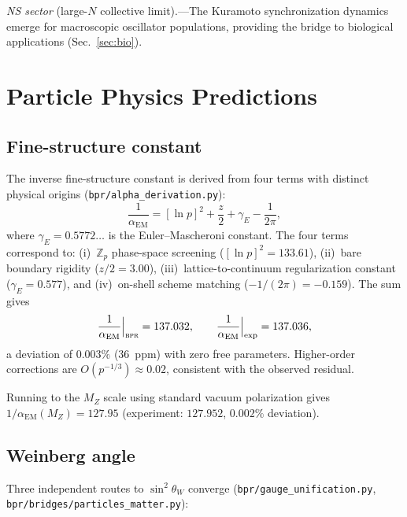 \documentclass[aps,prd,twocolumn,superscriptaddress,longbibliography,nofootinbib]{revtex4-2}
\newcommand{\Zp}{\mathbb{Z}_p}
\newcommand{\sinW}{\sin^2\!\theta_W}
\newcommand{\alphaEM}{\alpha_{\mathrm{EM}}}
\newcommand{\MZ}{M_Z}
\newcommand{\bpr}{\textsc{bpr}}
\begin{document}
\textit{NS sector} (large-$N$ collective limit).---The Kuramoto
synchronization dynamics emerge for macroscopic oscillator
populations, providing the bridge to biological applications
(Sec.~\ref{sec:bio}).


\section{Particle Physics Predictions}
\label{sec:particle}

\subsection{Fine-structure constant}

The inverse fine-structure constant is derived from four terms with
distinct physical origins (\texttt{bpr/alpha\_derivation.py}):
\begin{equation}
\frac{1}{\alphaEM} = [\ln p]^2 + \frac{z}{2} + \gamma_E
  - \frac{1}{2\pi},
\label{eq:alpha}
\end{equation}
where $\gamma_E = 0.5772\ldots$ is the Euler--Mascheroni constant.
The four terms correspond to: (i)~$\Zp$ phase-space screening
($[\ln p]^2 = 133.61$), (ii)~bare boundary rigidity ($z/2 = 3.00$),
(iii)~lattice-to-continuum regularization constant ($\gamma_E =
0.577$), and (iv)~on-shell scheme matching ($-1/(2\pi) = -0.159$).
The sum gives
\begin{equation}
\frac{1}{\alphaEM}\Big|_{\bpr} = 137.032, \qquad
\frac{1}{\alphaEM}\Big|_{\mathrm{exp}} = 137.036,
\label{eq:alpha_value}
\end{equation}
a deviation of $0.003\%$ (36~ppm) with zero free parameters.
Higher-order corrections are $O(p^{-1/3}) \approx 0.02$, consistent
with the observed residual.

Running to the $\MZ$ scale using standard vacuum polarization gives
$1/\alphaEM(\MZ) = 127.95$ (experiment: $127.952$, $0.002\%$
deviation).

\subsection{Weinberg angle}

Three independent routes to $\sinW$ converge
(\texttt{bpr/gauge\_unification.py},
\texttt{bpr/bridges/particles\_matter.py}):
\end{document}
